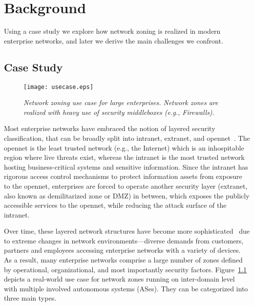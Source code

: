 \chapter{Background}
\label{background}

Using a case study we explore how network zoning is realized in modern enterprise networks, and later we derive the main challenges we confront.

\section{Case Study}
\label{sec:casestudy}

\begin{figure}[htb]
	\begin{center}
		\texttt{[image: usecase.eps]}
	\end{center}
	\caption{\textit{Network zoning use case for large enterprises. Network zones are
	realized with heavy use of security middleboxes (e.g., Firewalls).}}
	\label{fig:usecase}
\end{figure}

Most enterprise networks have embraced the notion of layered security classification,
that can be broadly split into intranet, extranet, and opennet~\cite{ramasamy2011towards}.
The opennet is the least trusted network (e.g., the Internet) which is an inhospitable region
where live threats exist, whereas the intranet is the most trusted network hosting
business-critical systems and sensitive information. Since the intranet has rigorous access
control mechanisms to protect information assets from exposure to the opennet, enterprises are
forced to operate another security layer (extranet, also known as demilitarized zone or DMZ) in between,
which exposes the publicly accessible services to the opennet, while reducing the attack surface of the intranet.

Over time, these layered network structures have become more sophisticated~\cite{obregon2015infrastructure}
due to extreme changes in network environments---diverse demands from customers, partners
and employees accessing enterprise networks with a variety of devices.
As a result, many enterprise networks
comprise a large number of zones defined by operational, organizational, and most
importantly security factors. Figure~\ref{fig:usecase} depicts a real-world use case for
network zones running on inter-domain level with multiple involved autonomous systems (ASes). They
can be categorized into three main types.

